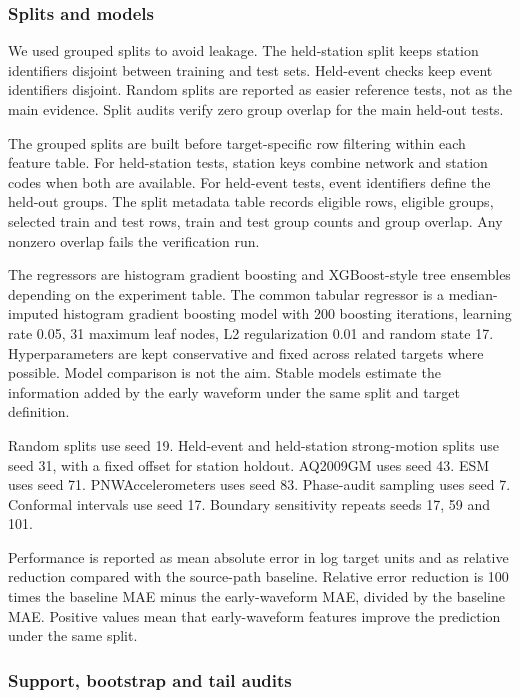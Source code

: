 \documentclass[
  10pt,
]{article}
\begin{document}
\subsubsection{Splits and models}\label{splits-and-models}

We used grouped splits to avoid leakage. The held-station split keeps
station identifiers disjoint between training and test sets. Held-event
checks keep event identifiers disjoint. Random splits are reported as
easier reference tests, not as the main evidence. Split audits verify
zero group overlap for the main held-out tests.

The grouped splits are built before target-specific row filtering within
each feature table. For held-station tests, station keys combine network
and station codes when both are available. For held-event tests, event
identifiers define the held-out groups. The split metadata table records
eligible rows, eligible groups, selected train and test rows, train and
test group counts and group overlap. Any nonzero overlap fails the
verification run.

The regressors are histogram gradient boosting and XGBoost-style tree
ensembles depending on the experiment table. The common tabular
regressor is a median-imputed histogram gradient boosting model with 200
boosting iterations, learning rate 0.05, 31 maximum leaf nodes, L2
regularization 0.01 and random state 17. Hyperparameters are kept
conservative and fixed across related targets where possible. Model
comparison is not the aim. Stable models estimate the information added
by the early waveform under the same split and target definition.

Random splits use seed 19. Held-event and held-station strong-motion
splits use seed 31, with a fixed offset for station holdout. AQ2009GM
uses seed 43. ESM uses seed 71. PNWAccelerometers uses seed 83.
Phase-audit sampling uses seed 7. Conformal intervals use seed 17.
Boundary sensitivity repeats seeds 17, 59 and 101.

Performance is reported as mean absolute error in log target units and
as relative reduction compared with the source-path baseline. Relative
error reduction is 100 times the baseline MAE minus the early-waveform
MAE, divided by the baseline MAE. Positive values mean that
early-waveform features improve the prediction under the same split.

\subsubsection{Support, bootstrap and tail
audits}\label{support-bootstrap-and-tail-audits}
\end{document}
